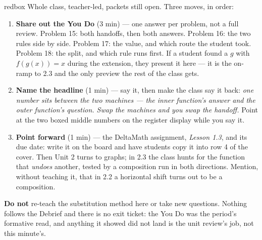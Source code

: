 \documentclass[10pt]{article}
\begin{document}
\boxguard[20]
\begin{skillbox}{redbox}
Whole class, teacher-led, packets still open. Three moves, in order:
\begin{enumerate}[itemsep=3pt]
  \item \textbf{Share out the You Do} (3 min) --- one answer per problem, not a full review.
        Problem 15: both handoffs, then both answers. Problem 16: the two rules side by side.
        Problem 17: the value, and which route the student took. Problem 18: the split, and which
        rule runs first. If a student found a $g$ with $f(g(x)) = x$ during the extension, they
        present it here --- it is the on-ramp to 2.3 and the only preview the rest of the class
        gets.
  \item \textbf{Name the headline} (1 min) --- say it, then make the class say it back:
        \textit{one number sits between the two machines --- the inner function's answer and the
        outer function's question. Swap the machines and you swap the handoff.} Point at the two
        boxed middle numbers on the register display while you say it.
  \item \textbf{Point forward} (1 min) --- the DeltaMath assignment, \textit{Lesson 1.3}, and its
        due date: write it on the board and have students copy it into row 4 of the cover. Then
        Unit 2 turns to graphs; in 2.3 the class hunts for the function that \emph{undoes}
        another, tested by a composition run in both directions. Mention, without teaching it,
        that in 2.2 a horizontal shift turns out to be a composition.
\end{enumerate}
\textbf{Do not} re-teach the substitution method here or take new questions. Nothing follows the
Debrief and there is no exit ticket: the You Do was the period's formative read, and anything it
showed did not land is the unit review's job, not this minute's.
\end{skillbox}
\end{document}
